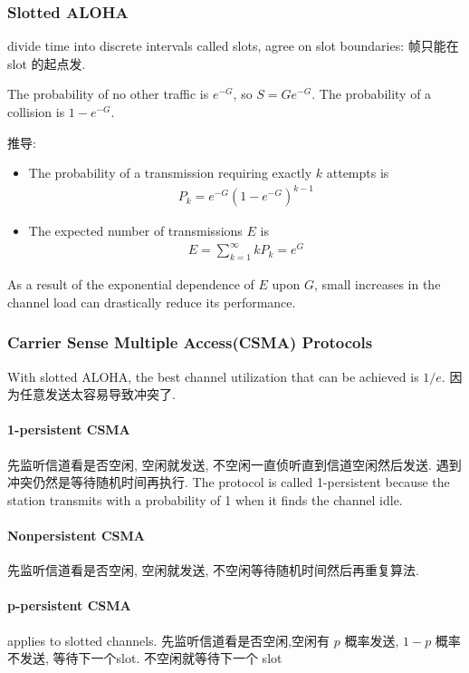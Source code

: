 \subsubsection{Slotted ALOHA}
divide time into discrete intervals called slots, agree on slot boundaries: 帧只能在 slot 的起点发. 

The probability of no other traffic is $e^{-G}$, so $S=Ge^{-G}$. The probability of a collision is  $1-e^{-G}$. 

推导:
\begin{itemize}
    \item The probability of a transmission requiring exactly $k$ attempts is
    \begin{align*}
        P_k=e^{-G}(1-e^{-G})^{k-1}
    \end{align*}
    \item The expected number of transmissions $E$ is
    \begin{align*}
        E=\sum_{k=1}^\infty kP_k=e^G
    \end{align*}
\end{itemize}
As a result of the exponential dependence of $E$ upon $G$, small increases in the channel load can drastically reduce its performance.

\subsubsection{Carrier Sense Multiple Access(CSMA) Protocols}
With slotted ALOHA, the best channel utilization that can be achieved is $1/e$. 因为任意发送太容易导致冲突了. 

\paragraph{1-persistent CSMA} 先监听信道看是否空闲, 空闲就发送, 不空闲一直侦听直到信道空闲然后发送. 遇到冲突仍然是等待随机时间再执行. The protocol is called 1-persistent because the station transmits with a probability of 1 when it finds the channel idle. 

\paragraph{Nonpersistent CSMA} 先监听信道看是否空闲, 空闲就发送, 不空闲等待随机时间然后再重复算法. 

\paragraph{p-persistent CSMA} applies to slotted channels. 先监听信道看是否空闲,空闲有 $p$ 概率发送, $1-p$ 概率不发送, 等待下一个slot. 不空闲就等待下一个 slot 

